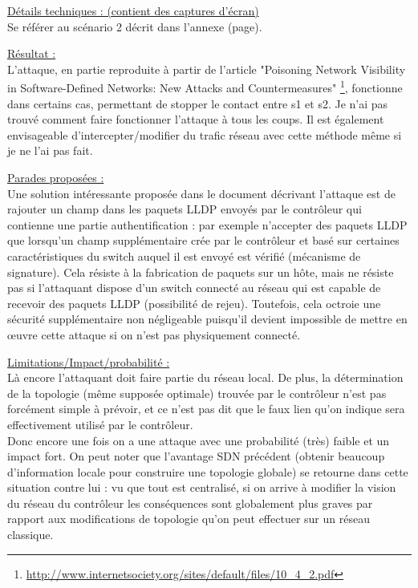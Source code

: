 \underline{Détails techniques : (contient des captures d'écran)}\\
Se référer au scénario 2 décrit dans l'annexe (page).

\underline{Résultat :}\\
L'attaque, en partie reproduite à partir de l'article "Poisoning Network Visibility in Software-Defined Networks: New Attacks and Countermeasures" \footnote{\url{http://www.internetsociety.org/sites/default/files/10_4_2.pdf}}, fonctionne dans certains cas, permettant de stopper le contact entre s1 et s2. Je n'ai pas trouvé comment faire fonctionner l'attaque à tous les coups. Il est également envisageable d'intercepter/modifier du trafic réseau avec cette méthode même si je ne l'ai pas fait.

\underline{Parades proposées :}\\
Une solution intéressante proposée dans le document décrivant l’attaque est de rajouter un champ dans les paquets LLDP envoyés par le contrôleur qui contienne une partie authentification : par exemple n’accepter des paquets LLDP que lorsqu’un champ supplémentaire crée par le contrôleur et basé sur certaines caractéristiques du switch auquel il est envoyé est vérifié (mécanisme de signature). Cela résiste à la fabrication de paquets sur un hôte, mais ne résiste pas si l’attaquant dispose d’un switch connecté au réseau qui est capable de recevoir des paquets LLDP (possibilité de rejeu). Toutefois, cela octroie une sécurité supplémentaire non négligeable puisqu’il devient impossible de mettre en œuvre cette attaque si on n’est pas physiquement connecté.

\underline{Limitations/Impact/probabilité :}\\
Là encore l’attaquant doit faire partie du réseau local. De plus, la détermination de la topologie (même supposée optimale) trouvée par le contrôleur n’est pas forcément simple à prévoir, et ce n’est pas dit que le faux lien qu’on indique sera effectivement utilisé par le contrôleur.\\
Donc encore une fois on a une attaque avec une probabilité (très) faible et un impact fort. On peut noter que l’avantage SDN précédent (obtenir beaucoup d'information locale pour construire une topologie globale) se retourne dans cette situation contre lui : vu que tout est centralisé, si on arrive à modifier la vision du réseau du contrôleur les conséquences sont globalement plus graves par rapport aux modifications de topologie qu'on peut effectuer sur un réseau classique.